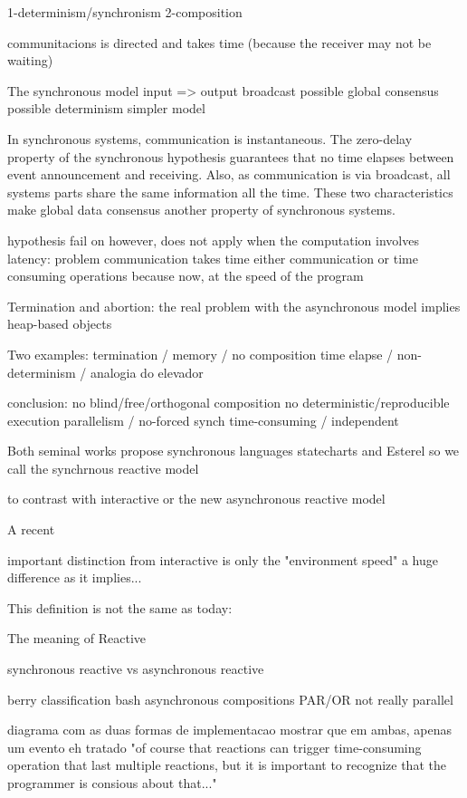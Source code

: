 \documentclass{acm_proc_article-sp}
\newcommand{\1}{\;}
\newcommand{\2}{\;\;}
\newcommand{\3}{\;\;\;}
\newcommand{\5}{\;\;\;\;\;}
\begin{document}
1-determinism/synchronism
2-composition

communitacions is directed and takes time (because the receiver may not be 
waiting)

The synchronous model
input => output
broadcast possible
global consensus possible
determinism
simpler model

In synchronous systems, communication is instantaneous.
The zero-delay property of the synchronous hypothesis guarantees that no time 
elapses between event announcement and receiving.
Also, as communication is via broadcast, all systems parts share the same 
information all the time.
These two characteristics make global data consensus another property of 
synchronous systems.


hypothesis fail on
however, does not apply when the computation involves latency:
problem communication takes time
either communication or time consuming operations
because now, at the speed of the program

Termination and abortion:
the real problem with the asynchronous model
implies
heap-based objects

Two examples:
termination / memory / no composition
time elapse / non-determinism / analogia do elevador

conclusion:
no blind/free/orthogonal composition
no deterministic/reproducible execution
parallelism / no-forced synch
time-consuming / independent


Both seminal works propose synchronous languages
statecharts and Esterel
so we call the
synchrnous reactive model

to contrast with interactive or the new asynchronous reactive model

A recent

important distinction from interactive is only the "environment speed"
a huge difference as it implies...

This definition is not the same as today:

The meaning of Reactive


synchronous reactive
vs
asynchronous reactive

berry classification
bash asynchronous
compositions
PAR/OR
not really parallel

diagrama com as duas formas de implementacao
mostrar que em ambas, apenas um evento eh tratado
"of course that reactions can trigger time-consuming operation that last 
multiple reactions, but it is important to recognize that the programmer is 
consious about that..."
\end{document}
